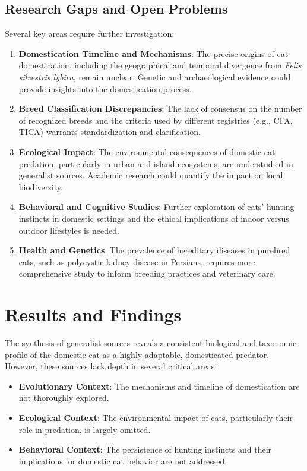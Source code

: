 \documentclass{article}
\begin{document}
\subsection{Research Gaps and Open Problems}
Several key areas require further investigation:
\begin{enumerate}
    \item \textbf{Domestication Timeline and Mechanisms}: The precise origins of cat domestication, including the geographical and temporal divergence from \textit{Felis silvestris lybica}, remain unclear. Genetic and archaeological evidence could provide insights into the domestication process.

    \item \textbf{Breed Classification Discrepancies}: The lack of consensus on the number of recognized breeds and the criteria used by different registries (e.g., CFA, TICA) warrants standardization and clarification.

    \item \textbf{Ecological Impact}: The environmental consequences of domestic cat predation, particularly in urban and island ecosystems, are understudied in generalist sources. Academic research could quantify the impact on local biodiversity.

    \item \textbf{Behavioral and Cognitive Studies}: Further exploration of cats' hunting instincts in domestic settings and the ethical implications of indoor versus outdoor lifestyles is needed.

    \item \textbf{Health and Genetics}: The prevalence of hereditary diseases in purebred cats, such as polycystic kidney disease in Persians, requires more comprehensive study to inform breeding practices and veterinary care.
\end{enumerate}

\section{Results and Findings}
The synthesis of generalist sources reveals a consistent biological and taxonomic profile of the domestic cat as a highly adaptable, domesticated predator. However, these sources lack depth in several critical areas:
\begin{itemize}
    \item \textbf{Evolutionary Context}: The mechanisms and timeline of domestication are not thoroughly explored.
    \item \textbf{Ecological Context}: The environmental impact of cats, particularly their role in predation, is largely omitted.
    \item \textbf{Behavioral Context}: The persistence of hunting instincts and their implications for domestic cat behavior are not addressed.
\end{itemize}
\end{document}
